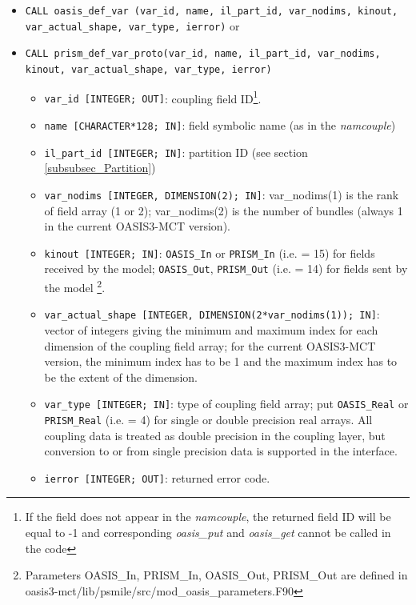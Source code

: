 \begin{itemize}

\item {\tt CALL oasis\_def\_var (var\_id, name, il\_part\_id,
    var\_nodims, kinout, \newline var\_actual\_shape, var\_type,
    ierror)} or

\item {\tt CALL prism\_def\_var\_proto(var\_id, name, il\_part\_id,
    var\_nodims, kinout, var\_actual\_shape, var\_type, ierror)}

  \begin{itemize}
  \item {\tt var\_id [INTEGER; OUT]}: coupling field ID\footnote{If
      the field does not appear in the {\it namcouple}, the returned
      field ID will be equal to -1 and corresponding {\it oasis\_put}
      and {\it oasis\_get} cannot be called in the code}.
  \item {\tt name [CHARACTER*128; IN]}: field symbolic name (as in the
    {\it namcouple})
  \item {\tt il\_part\_id [INTEGER; IN]}: partition ID (see section
    \ref{subsubsec_Partition})
  \item {\tt var\_nodims [INTEGER, DIMENSION(2); IN]}: var\_nodims(1)
    is the rank of field array (1 or 2); var\_nodims(2) is the number
    of bundles (always 1 in the current OASIS3-MCT version).
  \item {\tt kinout [INTEGER; IN]}: {\tt OASIS\_In} or {\tt PRISM\_In}
    (i.e. = 15) for fields received by the model; {\tt OASIS\_Out},
    {\tt PRISM\_Out} (i.e. = 14) for fields sent by the model
    \footnote{Parameters OASIS\_In, PRISM\_In, OASIS\_Out, PRISM\_Out
      are defined in
      oasis3-mct/lib/psmile/src/mod\_oasis\_parameters.F90}.
  \item {\tt var\_actual\_shape [INTEGER, DIMENSION(2*var\_nodims(1));
      IN]}: vector of integers giving the minimum and maximum index
    for each dimension of the coupling field array; for the current
    OASIS3-MCT version, the minimum index has to be 1 and the maximum
    index has to be the extent of the dimension.
  \item {\tt var\_type [INTEGER; IN]}: type of coupling field array;
    put {\tt OASIS\_Real} or {\tt PRISM\_Real} (i.e. = 4) for single
    or double precision real arrays.  All coupling data is treated as
    double precision in the coupling layer, but conversion to or from
    single precision data is supported in the interface.
  \item {\tt ierror [INTEGER; OUT]}: returned error code.
  \end{itemize}
\end{itemize}

